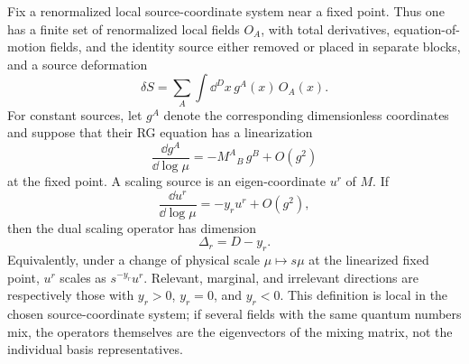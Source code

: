 \begin{definition}
\label{def:wilson-fisher-scaling-operator-source-chart}
Fix a renormalized local source-coordinate system near a fixed point.  Thus one has a
finite set of renormalized local fields \(O_A\), with total derivatives,
equation-of-motion fields, and the identity source either removed or placed in
separate blocks, and a source deformation
\[
  \delta S
  =
  \sum_A\int \dd^D x\, g^A(x)\,O_A(x).
\]
For constant sources, let \(g^A\) denote the corresponding dimensionless
coordinates and suppose that their RG equation has a linearization
\[
  \frac{\dd g^A}{\dd\log\mu}
  =
  -M^A{}_B\,g^B+O(g^2)
\]
at the fixed point.  A scaling source is an eigen-coordinate \(u^r\) of
\(M\).  If
\[
  \frac{\dd u^r}{\dd\log\mu}
  =
  -y_r u^r+O(g^2),
\]
then the dual scaling operator has dimension
\[
  \Delta_r=D-y_r .
\]
Equivalently, under a change of physical scale \(\mu\mapsto s\mu\) at the
linearized fixed point, \(u^r\) scales as \(s^{-y_r}u^r\).  Relevant,
marginal, and irrelevant directions are respectively those with
\(y_r>0\), \(y_r=0\), and \(y_r<0\).  This definition is local in the chosen
source-coordinate system; if several fields with the same quantum numbers mix, the
operators themselves are the eigenvectors of the mixing matrix, not the
individual basis representatives.
\end{definition}

